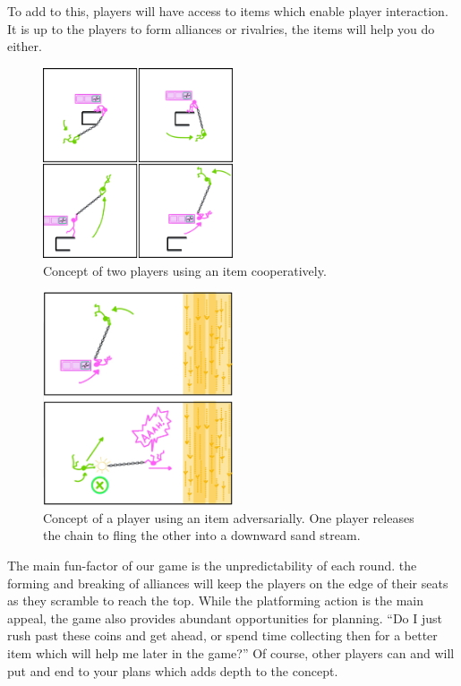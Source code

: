 To add to this, players will have access to items which enable player interaction. It is up to the players to form alliances or rivalries, the items will help you do either.

\begin{figure}[h]
    \centering
    \includegraphics[width=0.5\textwidth]{figures/topmeifyoucan_concept_rope_coop.png}
    \caption{Concept of two players using an item cooperatively.}
    \label{fig:concept-coop}
\end{figure}

\begin{figure}[h]
    \centering
    \includegraphics[width=0.5\textwidth]{figures/topmeifyoucan_concept_rope_betrayal.png}
    \caption{Concept of a player using an item adversarially. One player releases the chain to fling the other into a downward sand stream.}
    \label{fig:concept-betrayal}
\end{figure}

The main fun-factor of our game is the unpredictability of each round. the forming and breaking of alliances will keep the players on the edge of their seats as they scramble to reach the top. While the platforming action is the main appeal, the game also provides abundant opportunities for planning. ``Do I just rush past these coins and get ahead, or spend time collecting then for a better item which will help me later in the game?'' Of course, other players can and will put and end to your plans which adds depth to the concept.

